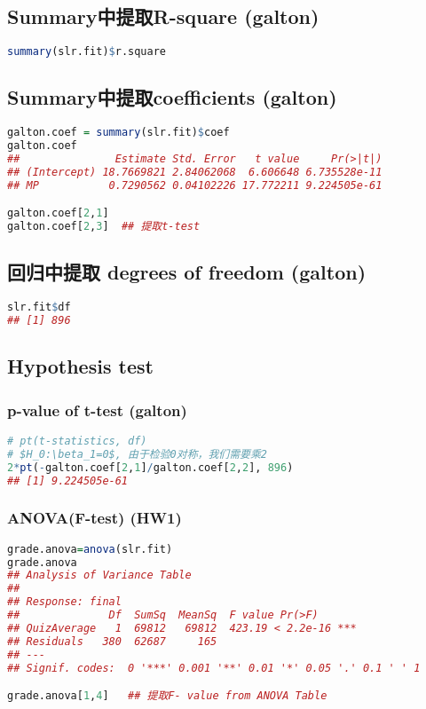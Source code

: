 \documentclass[11pt,a4paper]{article}
\begin{document}
\subsection{Summary中提取R-square (galton)}
\begin{lstlisting}[language=R]
summary(slr.fit)$r.square
\end{lstlisting}
\subsection{Summary中提取coefficients (galton)}
\begin{lstlisting}[language=R]
galton.coef = summary(slr.fit)$coef
galton.coef
##               Estimate Std. Error   t value     Pr(>|t|)
## (Intercept) 18.7669821 2.84062068  6.606648 6.735528e-11
## MP           0.7290562 0.04102226 17.772211 9.224505e-61

galton.coef[2,1]
galton.coef[2,3]  ## 提取t-test
\end{lstlisting}

\subsection{回归中提取 degrees of freedom (galton)}
\begin{lstlisting}[language=R]
slr.fit$df
## [1] 896
\end{lstlisting}












\subsection{Hypothesis test}
\subsubsection{p-value of t-test (galton)}
\begin{lstlisting}[language=R]
# pt(t-statistics, df)
# $H_0:\beta_1=0$, 由于检验0对称，我们需要乘2
2*pt(-galton.coef[2,1]/galton.coef[2,2], 896)
## [1] 9.224505e-61
\end{lstlisting}


\subsubsection{ANOVA(F-test) (HW1)}
\begin{lstlisting}[language=R]
grade.anova=anova(slr.fit)
grade.anova
## Analysis of Variance Table
##
## Response: final
##              Df  SumSq  MeanSq  F value Pr(>F)
## QuizAverage   1  69812   69812  423.19 < 2.2e-16 ***
## Residuals   380  62687     165
## ---
## Signif. codes:  0 '***' 0.001 '**' 0.01 '*' 0.05 '.' 0.1 ' ' 1

grade.anova[1,4]   ## 提取F- value from ANOVA Table
\end{lstlisting}
\end{document}
